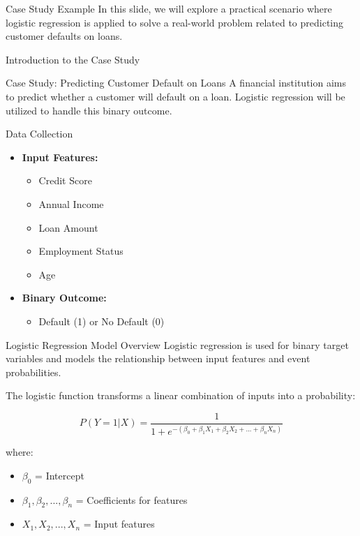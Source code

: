 \documentclass[aspectratio=169]{beamer}
\begin{document}
\begin{frame}[fragile]{Case Study Example}
  In this slide, we will explore a practical scenario where logistic regression is applied to solve a real-world problem related to predicting customer defaults on loans.
\end{frame}

\begin{frame}[fragile]{Introduction to the Case Study}
  \begin{block}{Case Study: Predicting Customer Default on Loans}
    A financial institution aims to predict whether a customer will default on a loan. 
    Logistic regression will be utilized to handle this binary outcome.
  \end{block}
\end{frame}

\begin{frame}[fragile]{Data Collection}
  \begin{itemize}
    \item \textbf{Input Features:}
      \begin{itemize}
        \item Credit Score
        \item Annual Income
        \item Loan Amount
        \item Employment Status
        \item Age
      \end{itemize}
    \item \textbf{Binary Outcome:}
      \begin{itemize}
        \item Default (1) or No Default (0)
      \end{itemize}
  \end{itemize}
\end{frame}

\begin{frame}[fragile]{Logistic Regression Model Overview}
  Logistic regression is used for binary target variables and models the relationship between input features and event probabilities.

  The logistic function transforms a linear combination of inputs into a probability:

  \begin{equation}
    P(Y=1|X) = \frac{1}{1 + e^{-(\beta_0 + \beta_1X_1 + \beta_2X_2 + ... + \beta_nX_n)}}
  \end{equation}

  where:
  \begin{itemize}
    \item \(\beta_0\) = Intercept
    \item \(\beta_1, \beta_2,...,\beta_n\) = Coefficients for features
    \item \(X_1, X_2, ..., X_n\) = Input features
  \end{itemize}
\end{frame}
\end{document}
